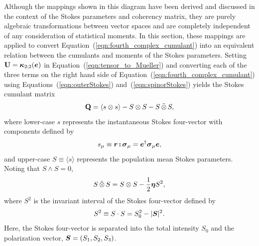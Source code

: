 \documentclass[twocolumn]{aastex6}
\newcommand{\mbf}[1]{\mbox{\boldmath $#1$}}
\newcommand{\Eqn}[1]{Equation~(\ref{eqn:#1})}
\newcommand{\Eqns}[3]{Equations~(\ref{eqn:#1}) #2~(\ref{eqn:#3})}
\newcommand{\irow}{\mu} \newcommand{\icol}{\nu}
\newcommand{\mean}[1]{\ensuremath{ \langle #1 \rangle }}
\newcommand{\Linner}[2]{\ensuremath{ { {#1} \cdot {#2} } } }
\newcommand{\outerBilinear}[2]{\ensuremath{{#1}\otimes{#2}}}
\newcommand{\stimes}{\ensuremath{\tilde{\otimes}}}
\newcommand{\spinorBilinear}[2]{\ensuremath{{#1}\,\stimes\,{#2}}}
\newcommand{\dc}[2]{\ensuremath{{#1}\,\mbf{:}\,{#2}}}
\newcommand{\pauli}[1]{\ensuremath{\mbf{\sigma}_{#1}}}
\newcommand{\inv}[1]{\ensuremath{ {#1}^2 }}
\begin{document}
%
Although the mappings shown in this diagram have been derived and
discussed in the context of the Stokes parameters and coherency
matrix, they are purely algebraic transformations between vector
spaces and are completely independent of any consideration of
statistical moments.
%
In this section, these mappings are applied to convert
\Eqn{fourth_complex_cumulant} into an equivalent relation between the
cumulants and moments of the Stokes parameters.
%
Setting ${\bf U} = \mbf{\kappa}_{2;2}(\mbf{e})$ in
\Eqn{tensor_to_Mueller} and converting each of the three terms on the
right hand side of \Eqn{fourth_complex_cumulant} using
\Eqns{outerStokes}{and}{spinorStokes} yields the Stokes cumulant matrix
%
\begin{equation}
  {\bf Q} = \langle\outerBilinear{s}{s}\rangle
  - \outerBilinear{S}{S} - \spinorBilinear{S}{S},
\label{eqn:Stokes_cumulant}
\end{equation}
%
where lower-case $s$ represents the instantaneous Stokes
four-vector with components defined by
\[
s_\irow\equiv\dc{\mbf{r}}{\pauli{\irow}}=\mbf{e}^\dagger\pauli{\irow}\mbf{e},
\]
and upper-case $S\equiv\mean{s}$ represents the population
mean Stokes parameters.  Noting that $S\wedge S=0$,
\begin{equation}
\spinorBilinear{S}{S}
  = S \otimes S - \frac{1}{2} \mbf{\eta}\inv{S},
\label{eqn:Lorentz_transformation}
\end{equation}
%
where $\inv{S}$ is the invariant interval of the Stokes
four-vector \citep[e.g.][]{bar63,scr+84,bri00} defined by
%
\begin{equation}
\inv{S} \equiv \Linner{S}{S} = S_0^2 - |\mbf{S}|^2.
\end{equation}
%
Here, the Stokes four-vector is separated into the total intensity
$S_0$ and the polarization vector, $\mbf{S}=(S_1,S_2,S_3)$.
\end{document}
